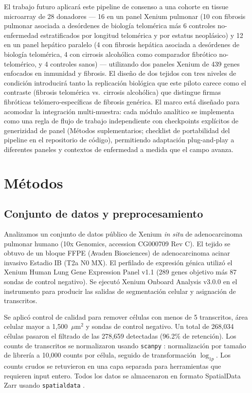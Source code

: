 \documentclass[12pt,a4paper]{article}
\begin{document}
El trabajo futuro aplicará este pipeline de consenso a una cohorte en tissue microarray de 28 donadores --- 16 en un panel Xenium pulmonar (10 con fibrosis pulmonar asociada a desórdenes de biología telomérica más 6 controles no-enfermedad estratificados por longitud telomérica y por estatus neoplásico) y 12 en un panel hepático paralelo (4 con fibrosis hepática asociada a desórdenes de biología telomérica, 4 con cirrosis alcohólica como comparador fibrótico no-telomérico, y 4 controles sanos) --- utilizando dos paneles Xenium de 439 genes enfocados en inmunidad y fibrosis. El diseño de dos tejidos con tres niveles de condición introducirá tanto la replicación biológica que este piloto carece como el contraste (fibrosis telomérica vs.\ cirrosis alcohólica) que distingue firmas fibróticas telómero-específicas de fibrosis genérica. El marco está diseñado para acomodar la integración multi-muestra: cada módulo analítico se implementa como una regla de flujo de trabajo independiente con checkpoints explícitos de generizidad de panel (Métodos suplementarios; checklist de portabilidad del pipeline en el repositorio de código), permitiendo adaptación plug-and-play a diferentes paneles y contextos de enfermedad a medida que el campo avanza.

\section*{Métodos}
\label{sec:methods}

\subsection*{Conjunto de datos y preprocesamiento}
Analizamos un conjunto de datos público de Xenium \textit{in situ} de adenocarcinoma pulmonar humano (10x Genomics, accession CG000709 Rev C). El tejido se obtuvo de un bloque FFPE (Avaden Biosciences) de adenocarcinoma acinar invasivo Estadio IB (T2a N0 MX). El perfilado de expresión génica utilizó el Xenium Human Lung Gene Expression Panel v1.1 (289 genes objetivo más 87 sondas de control negativo). Se ejecutó Xenium Onboard Analysis v3.0.0 en el instrumento para producir las salidas de segmentación celular y asignación de transcritos.

Se aplicó control de calidad para remover células con menos de 5 transcritos, área celular mayor a 1,500~$\mu$m$^{2}$ y sondas de control negativo. Un total de 268,034 células pasaron el filtrado de las 278,659 detectadas (96.2\% de retención). Los counts de transcritos se normalizaron usando \texttt{scanpy} \citep{wolf2018scanpy}: normalización por tamaño de librería a 10,000 counts por célula, seguido de transformación $\log_{1p}$. Los counts crudos se retuvieron en una capa separada para herramientas que requieren input entero. Todos los datos se almacenaron en formato SpatialData Zarr usando \texttt{spatialdata} \citep{marconato2024spatialdata}.
\end{document}
